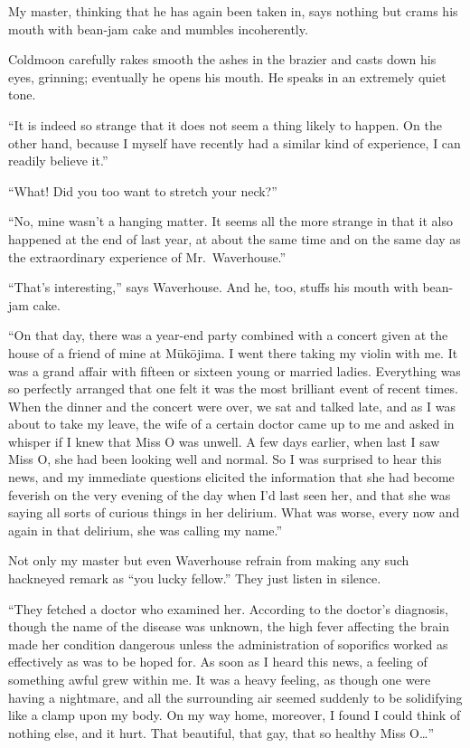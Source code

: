 \documentclass[12pt, openright]{book}
\begin{document}
My master, thinking that he has again been taken in, says nothing but
crams his mouth with bean-jam cake and mumbles incoherently.

Coldmoon carefully rakes smooth the ashes in the brazier and casts down
his eyes, grinning; eventually he opens his mouth. He speaks in an
extremely quiet tone.

``It is indeed so strange that it does not seem a thing likely to
happen. On the other hand, because I myself have recently had a similar
kind of experience, I can readily believe it.''

``What! Did you too want to stretch your neck?''

``No, mine wasn't a hanging matter. It seems all the more strange in
that it also happened at the end of last year, at about the same time
and on the same day as the extraordinary experience of Mr.~Waverhouse.''

``That's interesting,'' says Waverhouse. And he, too, stuffs his mouth
with bean-jam cake.

``On that day, there was a year-end party combined with a concert given
at the house of a friend of mine at Mūkōjima. I went there taking my
violin with me. It was a grand affair with fifteen or sixteen young or
married ladies. Everything was so perfectly arranged that one felt it
was the most brilliant event of recent times. When the dinner and the
concert were over, we sat and talked late, and as I was about to take my
leave, the wife of a certain doctor came up to me and asked in whisper
if I knew that Miss O was unwell. A few days earlier, when last I saw
Miss O, she had been looking well and normal. So I was surprised to hear
this news, and my immediate questions elicited the information that she
had become feverish on the very evening of the day when I'd last seen
her, and that she was saying all sorts of curious things in her
delirium. What was worse, every now and again in that delirium, she was
calling my name.''

Not only my master but even Waverhouse refrain from making any such
hackneyed remark as ``you lucky fellow.'' They just listen in silence.

``They fetched a doctor who examined her. According to the doctor's
diagnosis, though the name of the disease was unknown, the high fever
affecting the brain made her condition dangerous unless the
administration of soporifics worked as effectively as was to be hoped
for. As soon as I heard this news, a feeling of something awful grew
within me. It was a heavy feeling, as though one were having a
nightmare, and all the surrounding air seemed suddenly to be solidifying
like a clamp upon my body. On my way home, moreover, I found I could
think of nothing else, and it hurt. That beautiful, that gay, that so
healthy Miss O\ldots{}''
\end{document}
